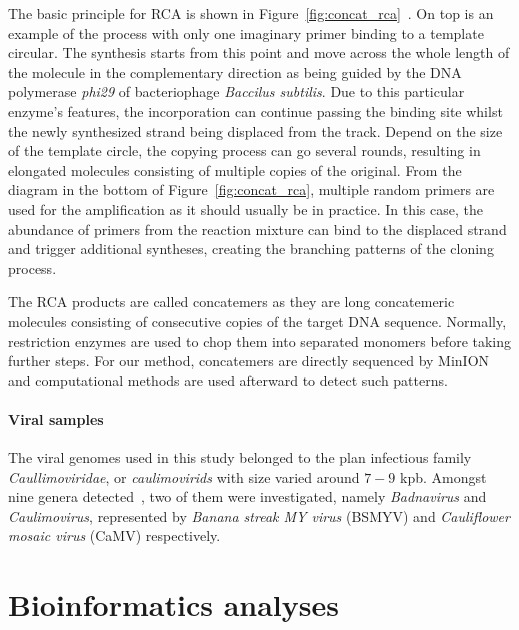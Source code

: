 The basic principle for RCA is shown in Figure~\ref{fig:concat_rca}~\cite{Johne2009rca}.
On top is an example of the process with only one imaginary primer binding to a template circular. The synthesis starts from this point and move across the whole length of the molecule in the complementary direction as being guided by the DNA polymerase  \emph{phi29} of bacteriophage \emph{Baccilus subtilis}.
Due to this particular enzyme's features, the incorporation can continue passing the binding site whilst the newly synthesized strand being displaced from the track.
Depend on the size of the template circle, the copying process can go several rounds, resulting in elongated molecules consisting of multiple copies of the original.
From the diagram in the bottom of Figure~\ref{fig:concat_rca}, multiple random primers are used for the amplification as it should usually be in practice. In this case, the abundance of primers from the reaction mixture can bind to the displaced strand and trigger additional syntheses, creating the branching patterns of the cloning process.

The RCA products are called concatemers as they are long concatemeric molecules consisting of consecutive copies of the target DNA sequence. Normally, restriction enzymes are used to chop them into separated monomers before taking further steps. For our method, concatemers are directly sequenced by MinION and computational methods are used afterward to detect such patterns.
\paragraph{Viral samples}
The viral genomes used in this study belonged to the plan infectious family \emph{Caullimoviridae}, or \emph{caulimovirids} with size varied around $7-9$ kpb.
Amongst nine genera detected~\cite{Geering2010ST,Mollov2013LZ}, two of them were investigated, namely \emph{Badnavirus} and \emph{Caulimovirus}, represented by \emph{Banana streak MY virus} (BSMYV) and \emph{Cauliflower mosaic virus} (CaMV) respectively.

\section{Bioinformatics analyses}

